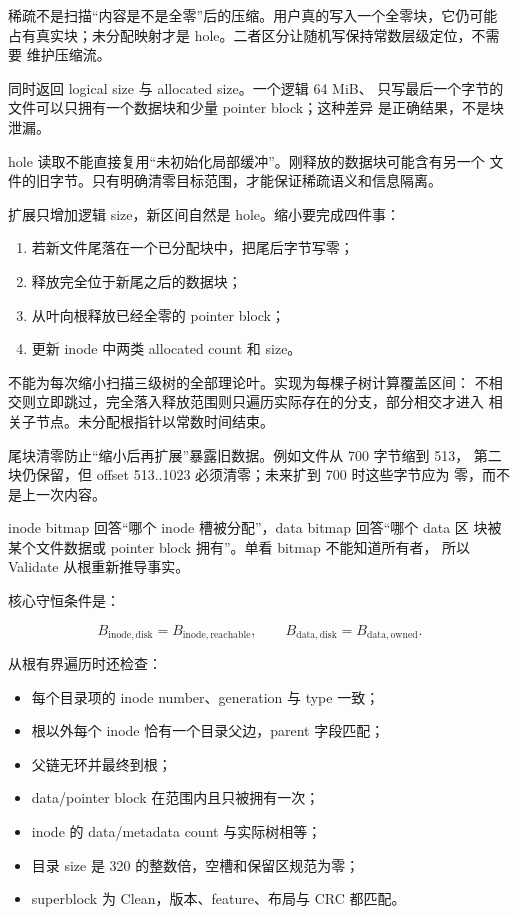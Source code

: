 稀疏不是扫描“内容是不是全零”后的压缩。用户真的写入一个全零块，它仍可能
占有真实块；未分配映射才是 hole。二者区分让随机写保持常数层级定位，不需要
维护压缩流。

 同时返回 logical size 与 allocated size。一个逻辑 64 MiB、
只写最后一个字节的文件可以只拥有一个数据块和少量 pointer block；这种差异
是正确结果，不是块泄漏。

\begin{failurebox}
hole 读取不能直接复用“未初始化局部缓冲”。刚释放的数据块可能含有另一个
文件的旧字节。只有明确清零目标范围，才能保证稀疏语义和信息隔离。
\end{failurebox}

扩展只增加逻辑 size，新区间自然是 hole。缩小要完成四件事：

\begin{enumerate}
  \item 若新文件尾落在一个已分配块中，把尾后字节写零；
  \item 释放完全位于新尾之后的数据块；
  \item 从叶向根释放已经全零的 pointer block；
  \item 更新 inode 中两类 allocated count 和 size。
\end{enumerate}

不能为每次缩小扫描三级树的全部理论叶。实现为每棵子树计算覆盖区间：
不相交则立即跳过，完全落入释放范围则只遍历实际存在的分支，部分相交才进入
相关子节点。未分配根指针以常数时间结束。

尾块清零防止“缩小后再扩展”暴露旧数据。例如文件从 700 字节缩到 513，
第二块仍保留，但 offset 513..1023 必须清零；未来扩到 700 时这些字节应为
零，而不是上一次内容。

inode bitmap 回答“哪个 inode 槽被分配”，data bitmap 回答“哪个 data 区
块被某个文件数据或 pointer block 拥有”。单看 bitmap 不能知道所有者，
所以 Validate 从根重新推导事实。

核心守恒条件是：

\[
  B_{\mathrm{inode,disk}}=B_{\mathrm{inode,reachable}},
  \qquad
  B_{\mathrm{data,disk}}=B_{\mathrm{data,owned}}.
\]

从根有界遍历时还检查：

\begin{itemize}
  \item 每个目录项的 inode number、generation 与 type 一致；
  \item 根以外每个 inode 恰有一个目录父边，parent 字段匹配；
  \item 父链无环并最终到根；
  \item data/pointer block 在范围内且只被拥有一次；
  \item inode 的 data/metadata count 与实际树相等；
  \item 目录 size 是 320 的整数倍，空槽和保留区规范为零；
  \item superblock 为 Clean，版本、feature、布局与 CRC 都匹配。
\end{itemize}

